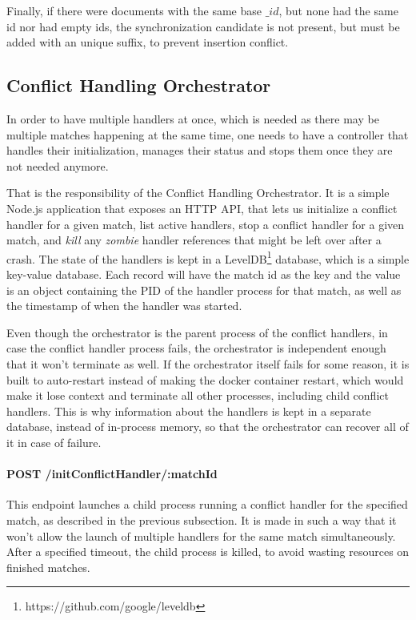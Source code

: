 Finally, if there were documents with the same base $\_id$, but none had the same id nor had empty ids, the synchronization candidate is not present, but must be added with an unique suffix, to prevent insertion conflict.

\subsection{Conflict Handling Orchestrator}

In order to have multiple handlers at once, which is needed as there may be multiple matches happening at the same time, one needs to have a controller that handles their initialization, manages their status and stops them once they are not needed anymore.

That is the responsibility of the Conflict Handling Orchestrator. It is a simple Node.js application that exposes an HTTP API, that lets us initialize a conflict handler for a given match, list active handlers, stop a conflict handler for a given match, and \textit{kill} any \textit{zombie} handler references that might be left over after a crash. The state of the handlers is kept in a LevelDB\footnote{https://github.com/google/leveldb} database, which is a simple key-value database. Each record will have the match id as the key and the value is an object containing the PID of the handler process for that match, as well as the timestamp of when the handler was started.

Even though the orchestrator is the parent process of the conflict handlers, in case the conflict handler process fails, the orchestrator is independent enough that it won't terminate as well. If the orchestrator itself fails for some reason, it is built to auto-restart instead of making the docker container restart, which would make it lose context and terminate all other processes, including child conflict handlers. This is why information about the handlers is kept in a separate database, instead of in-process memory, so that the orchestrator can recover all of it in case of failure.

\paragraph{POST /initConflictHandler/:matchId}
This endpoint launches a child process running a conflict handler for the specified match, as described in the previous subsection. It is made in such a way that it won't allow the launch of multiple handlers for the same match simultaneously. After a specified timeout, the child process is killed, to avoid wasting resources on finished matches.

